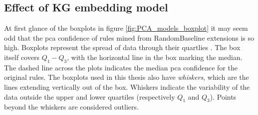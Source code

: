 \subsection{Effect of KG embedding model}
At first glance of the boxplots in figure \ref{fig:PCA_models_boxplot} it may seem odd that the \gls{pca} confidence of rules mined from RandomBaseline extensions is so high. Boxplots represent the spread of data through their quartlies \cite{dutoit2012graphical}. The box itself covers $Q_1-Q_3$, with the horizontal line in the box marking the median. The dashed line across the plots indicates the median \gls{pca} confidence for the original rules. The boxplots used in this thesis also have \textit{whiskers}, which are the lines extending vertically out of the box. Whiskers indicate the variability of the data outside the upper and lower quartiles (respectively $Q_1$ and $Q_3$). Points beyond the whiskers are considered outliers.

